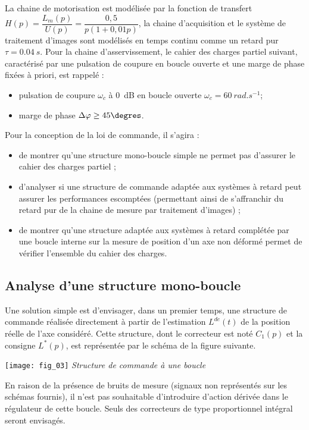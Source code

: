 \begin{multicols}{2}
La chaine de motorisation est modélisée par la fonction de transfert $H(p)=\dfrac{L_m(p)}{U(p)}=\dfrac{0,5}{p\left( 1+0,01 p\right)}$, la chaine d'acquisition et le système de traitement d’images sont modélisés en temps continu comme un retard pur $\tau=\SI{0,04}{s}$.
Pour la chaine d’asservissement, le cahier des charges partiel suivant, caractérisé par une pulsation de coupure en boucle ouverte et une marge de phase fixées à priori, est rappelé :
\begin{itemize}
\item pulsation de coupure $\omega_c$ à \SI{0}{dB} en boucle ouverte $\omega_c = \SI{60}{rad.s^{-1}}$;
\item marge de phase $\Delta \varphi \geq 45 \degres$.
\end{itemize}


Pour la conception de la loi de commande, il s’agira :
\begin{itemize}
\item de montrer qu’une structure mono-boucle simple ne permet pas d’assurer le cahier des charges partiel ;
\item d’analyser si une structure de commande adaptée aux systèmes à retard peut assurer les performances
escomptées (permettant ainsi de s’affranchir du retard pur de la chaine de mesure par traitement d’images) ;
\item de montrer qu’une structure adaptée aux systèmes à retard complétée par une boucle interne sur la mesure
de position d’un axe non déformé permet de vérifier l’ensemble du cahier des charges.
\end{itemize}

\subsection*{Analyse d’une structure mono-boucle}

Une solution simple est d’envisager, dans un premier temps, une structure de commande réalisée directement à
partir de l’estimation $L^{de}(t)$ de la position réelle de l’axe considéré. Cette structure, dont le correcteur est noté
$C_1(p)$ et la consigne $L^{*}(p)$, est représentée par le schéma de la figure suivante.



\begin{center}
\texttt{[image: fig\_03]}
\textit{Structure de commande à une boucle}
\end{center}

En raison de la présence de bruits de mesure (signaux non représentés sur les schémas fournis), il n’est pas
souhaitable d’introduire d’action dérivée dans le régulateur de cette boucle. Seuls des correcteurs de type
proportionnel intégral seront envisagés.


\end{multicols}
